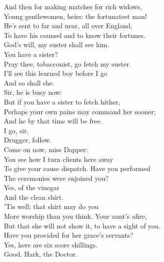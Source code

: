 \documentclass[a4paper,oneside,12pt]{memoir}
\begin{document}
\begin{drama*}
And then for making matches for rich widows,\\
Young gentlewomen, heirs: the fortunatest man!\\
He's sent to far and near, all over England,\\
To have his counsel and to know their fortunes.\\
\kastrilspeaks God's will, my suster shall see him.\\
\facespeaks {} You have a sister?\\
\kastrilspeaks Pray thee, tobacconist, go fetch my suster.\\
I'll see this learned boy before I go\\
And so shall she.\\
\facespeaks {} Sir, he is busy now:\\
But if you have a sister to fetch hither,\\
Perhaps your own pains may command her sooner;\\
And he by that time will be free.\\
\kastrilspeaks {} I go, sir.\\
\facespeaks Drugger, follow.\\
 Come on now, miss Dapper:\\
You see how I turn clients here away\\
To give your cause dispatch. Have you performed\\
The ceremonies were enjoined you?\\
\dapperspeaks {} Yes, of the vinegar\\
And the clean shirt.\\
\facespeaks {} 'Tis well: that shirt may do you\\
More worship than you think. Your aunt's afire,\\
But that she will not show it, to have a sight of you.\\
Have you provided for her grace's servants?\\
\dapperspeaks Yes, here are six score shillings.\\
\facespeaks {} Good. Hark, the Doctor.\\

\end{drama*}
\end{document}
